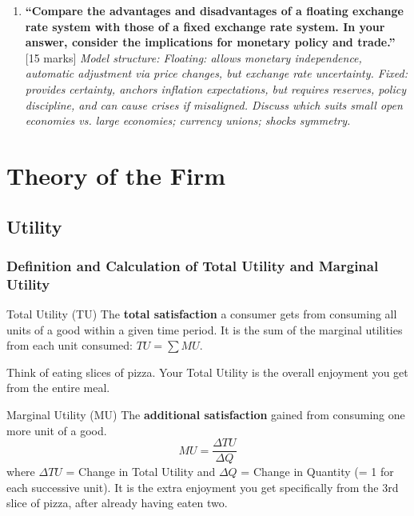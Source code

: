 \documentclass[11pt, a4paper, twoside]{book}
\begin{document}
\begin{exampractice}
\begin{enumerate}[leftmargin=*]
\item \textbf{``Compare the advantages and disadvantages of a floating exchange rate system with those of a fixed exchange rate system. In your answer, consider the implications for monetary policy and trade.''} [15 marks]
\textit{Model structure: Floating: allows monetary independence, automatic adjustment via price changes, but exchange rate uncertainty. Fixed: provides certainty, anchors inflation expectations, but requires reserves, policy discipline, and can cause crises if misaligned. Discuss which suits small open economies vs. large economies; currency unions; shocks symmetry.}
\end{enumerate}
\end{exampractice}

\chapter{Theory of the Firm}

\section{Utility}

\subsection{Definition and Calculation of Total Utility and Marginal Utility}

\begin{keyterm}{Total Utility (TU)}
The \textbf{total satisfaction} a consumer gets from consuming all units of a good within a given time period. It is the sum of the marginal utilities from each unit consumed: $TU = \sum MU$.
\end{keyterm}

Think of eating slices of pizza. Your Total Utility is the overall enjoyment you get from the entire meal.

\begin{keyterm}{Marginal Utility (MU)}
The \textbf{additional satisfaction} gained from consuming one more unit of a good.
\[ MU = \frac{\Delta TU}{\Delta Q} \]
where $\Delta TU$ = Change in Total Utility and $\Delta Q$ = Change in Quantity (= 1 for each successive unit). It is the extra enjoyment you get specifically from the 3rd slice of pizza, after already having eaten two.
\end{keyterm}
\end{document}
